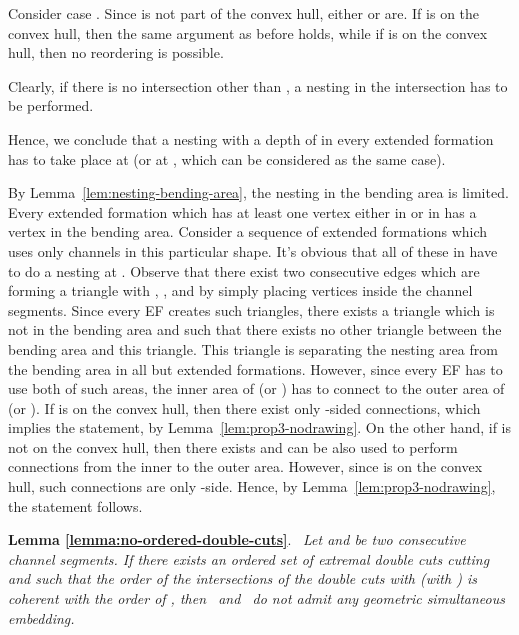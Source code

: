 \documentclass[a4paper,10pt]{llncs}
\newcounter{prop}
\renewenvironment{proof}
{{\bf Proof:}}{\hspace*{\fill}\par\vspace{2mm}}
\newcommand{\rephrase}[3]{\noindent\textbf{#1 #2}.~\emph{#3}}
\newcommand{\T}{\mbox{ }}
\renewcommand{\P}{\mbox{ }}
\begin{document}
\begin{proof}
Consider case . Since  is not part of the convex hull, either  or  are. If  is on the convex hull, then the same argument as before holds, while if  is on the convex hull, then no reordering is possible.

Clearly, if there is no intersection other than , a nesting in the intersection  has to be performed.

Hence, we conclude that a nesting with a depth of  in every extended formation has to take place at  (or at , which can be considered as the same case).

By Lemma~\ref{lem:nesting-bending-area}, the nesting in the bending area is limited. Every extended formation  which has at least one vertex either in  or in  has a vertex in the bending area. Consider a sequence of extended formations  which uses only channels in this particular shape. It's obvious that all of these  in  have to do a nesting at . Observe that there exist two consecutive edges which are forming a triangle with , , and  by simply placing vertices inside the channel segments. Since every EF creates such triangles, there exists a triangle which is not in the bending area and such that there exists no other triangle
between the bending area and this triangle. This triangle is separating the nesting area from the bending area in all but  extended formations. However, since every EF has to use both of such areas, the inner area of  (or ) has to connect to the outer area of  (or ). If  is on the convex hull, then there exist only -sided connections, which implies the statement, by Lemma~\ref{lem:prop3-nodrawing}.
On the other hand, if  is not on the convex hull, then there exists  and  can be also used to perform connections from the inner to the outer area. However, since  is on the convex hull, such connections are only -side. Hence, by Lemma~\ref{lem:prop3-nodrawing}, the statement follows.
\end{proof}

\rephrase{Lemma}{\ref{lemma:no-ordered-double-cuts}}{
Let  and  be two consecutive channel segments. If there exists an ordered set  of extremal double cuts cutting  and  such that the order of the intersections of the double cuts with  (with ) is coherent with the order of , then \T and \P do not admit any geometric simultaneous embedding.
}
\end{document}
